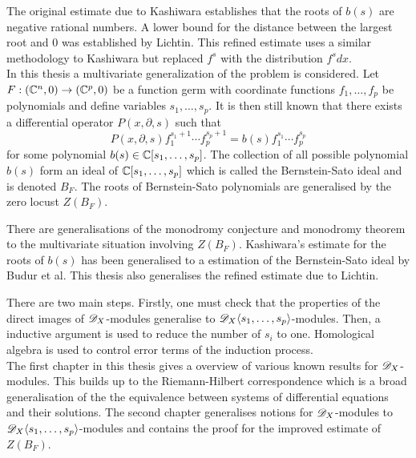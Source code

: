 The original estimate due to Kashiwara establishes that the roots of $b(s)$ are negative rational numbers.
A lower bound for the distance between the largest root and $0$ was established by Lichtin.
This refined estimate uses a similar methodology to Kashiwara but replaced $f^s$ with the distribution $f^s dx$.
\\

In this thesis a multivariate generalization of the problem is considered.
Let $F:(\mathbb{C}^{n},0)\to (\mathbb{C}^p,0)$ be a function germ with coordinate functions $f_1,\ldots, f_p$ be polynomials and define variables $s_1,\ldots, s_p$.
It is then still known that there exists a differential operator $P(x,\partial, s)$ such that
$$P(x,\partial,s) f_1^{s_1 + 1}\cdots f_p^{s_p + 1} = b(s)f_1^{s_1}\cdots f_p^{s_p}$$
for some polynomial $b(s) \in \mathbb{C}[s_1,\ldots, s_p]$.
The collection of all possible polynomial $b(s)$ form an ideal of $\mathbb{C}[s_1,\ldots,s_p]$ which is called the Bernstein-Sato ideal and is denoted $B_{F}$.
The roots of Bernstein-Sato polynomials are generalised by the zero locust $Z(B_F)$.

There are generalisations of the monodromy conjecture and monodromy theorem to the multivariate situation involving $Z(B_F)$.
Kashiwara's estimate for the roots of $b(s)$ has been generalised to a estimation of the Bernstein-Sato ideal by Budur et al.
This thesis also generalises the refined estimate due to Lichtin.

There are two main steps.
Firstly, one must check that the properties of the direct images of $\mathscr{D}_X$-modules generalise to $\mathscr{D}_X\langle s_1,\ldots, s_p \rangle$-modules.
Then, a inductive argument is used to reduce the number of $s_i$ to one.
Homological algebra is used to control error terms of the induction process.\\

The first chapter in this thesis gives a overview of various known results for $\mathscr{D}_X$-modules.
This builds up to the Riemann-Hilbert correspondence which is a broad generalisation of the the equivalence between systems of differential equations and their solutions.
The second chapter generalises notions for $\mathscr{D}_X$-modules to $\mathscr{D}_X\langle s_1,\ldots, s_p \rangle$-modules and contains the proof for the improved estimate of $Z(B_F)$.
